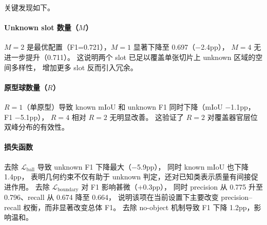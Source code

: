 \documentclass[3p,twocolumn,authoryear]{elsarticle}
\begin{document}
\begin{table}[t]
\centering
\footnotesize
\setlength{\tabcolsep}{4pt}
\caption{Synapse A1 结构消融。Baseline 为默认配置（$M=2, R=2$，完整损失，空对象机制开启）。
每行仅改变一个变量。}\label{tab:ablation}
\end{table}

关键发现如下。

\paragraph{Unknown slot 数量（$M$）}
$M=2$ 是最优配置（F1=0.721），$M=1$ 显著下降至 0.697（$-$2.4pp），
$M=4$ 无进一步提升（0.711）。
这说明两个 slot 已足以覆盖单张切片上 unknown 区域的空间多样性，
增加更多 slot 反而引入冗余。

\paragraph{原型球数量（$R$）}
$R=1$（单原型）导致 known mIoU 和 unknown F1 同时下降（mIoU $-$1.1pp，F1 $-$5.1pp），
$R=4$ 相对 $R=2$ 无明显改善。
这验证了 $R=2$ 对覆盖器官层位双峰分布的有效性。

\paragraph{损失函数}
去除 $\mathcal{L}_{\text{ball}}$ 导致 unknown F1 下降最大（$-$5.9pp），
同时 known mIoU 也下降 1.4pp，
表明几何约束不仅有助于 unknown 判定，还对已知类表示质量有间接促进作用。
去除 $\mathcal{L}_{\text{boundary}}$ 对 F1 影响甚微（+0.3pp），
同时 precision 从 0.775 升至 0.796、recall 从 0.674 降至 0.664，
说明该项在当前设置下主要改变 precision--recall 权衡，而非显著改变总体 F1。
去除 no-object 机制导致 F1 下降 1.2pp，影响温和。
\end{document}
